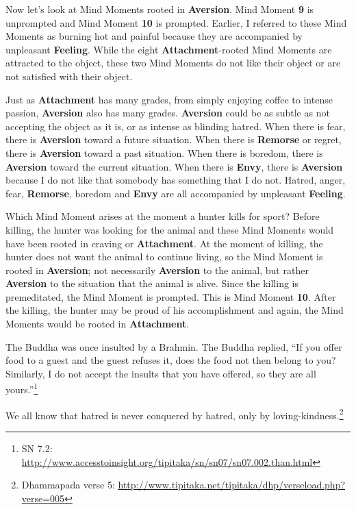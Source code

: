Now let’s look at Mind Moments rooted in \textbf{Aversion}. Mind Moment \textbf{9} is unprompted and Mind Moment \textbf{10} is prompted. Earlier, I referred to these Mind Moments as burning hot and painful because they are accompanied by unpleasant \textbf{Feeling}. While the eight \textbf{Attachment}-rooted Mind Moments are attracted to the object, these two Mind Moments do not like their object or are not satisfied with their object.

Just as \textbf{Attachment} has many grades, from simply enjoying coffee to intense passion, \textbf{Aversion} also has many grades. \textbf{Aversion} could be as subtle as not accepting the object as it is, or as intense as blinding hatred. When there is fear, there is \textbf{Aversion} toward a future situation. When there is \textbf{Remorse} or regret, there is \textbf{Aversion} toward a past situation. When there is boredom, there is \textbf{Aversion} toward the current situation. When there is \textbf{Envy}, there is \textbf{Aversion} because I do not like that somebody has something that I do not. Hatred, anger, fear, \textbf{Remorse}, boredom and \textbf{Envy} are all accompanied by unpleasant \textbf{Feeling}.

Which Mind Moment arises at the moment a hunter kills for sport? Before killing, the hunter was looking for the animal and these Mind Moments would have been rooted in craving or \textbf{Attachment}. At the moment of killing, the hunter does not want the animal to continue living, so the Mind Moment is rooted in \textbf{Aversion}; not necessarily \textbf{Aversion} to the animal, but rather \textbf{Aversion} to the situation that the animal is alive. Since the killing is premeditated, the Mind Moment is prompted. This is Mind Moment \textbf{10}. After the killing, the hunter may be proud of his accomplishment and again, the Mind Moments would be rooted in \textbf{Attachment}.

The Buddha was once insulted by a Brahmin. The Buddha replied, “If you offer food to a guest and the guest refuses it, does the food not then belong to you? Similarly, I do not accept the insults that you have offered, so they are all yours.”\footnote{SN 7.2: \url{http://www.accesstoinsight.org/tipitaka/sn/sn07/sn07.002.than.html}}

We all know that hatred is never conquered by hatred, only by loving-kindness.\footnote{Dhammapada verse 5: \url{http://www.tipitaka.net/tipitaka/dhp/verseload.php?verse=005}}

\pagebreak

